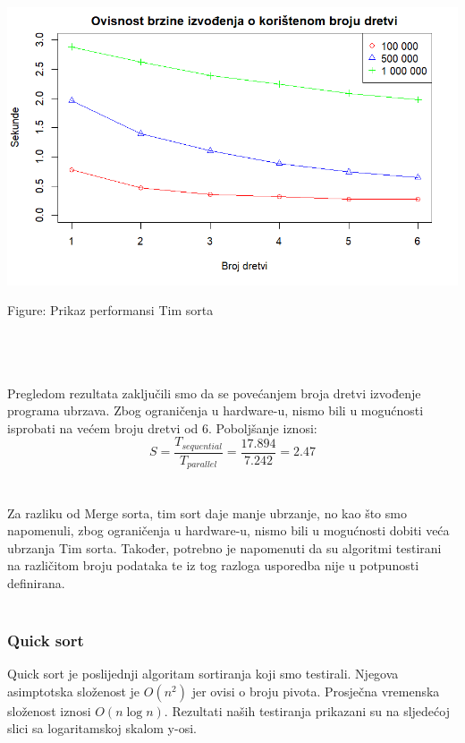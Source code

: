 \documentclass[conference]{IEEEtran}
\begin{document}
\\

\noindent
\begin{minipage}{\linewidth}
\centering
\includegraphics[width=1\linewidth]{timPerf.png}
\caption{Figure: Prikaz performansi Tim sorta}
\label{tim - performance}
\end{minipage}
\\
\\
\\

Pregledom rezultata zaključili smo da se povećanjem broja dretvi izvođenje programa ubrzava. Zbog ograničenja u hardware-u, nismo bili u mogućnosti isprobati na većem broju dretvi od 6. Poboljšanje iznosi:
\\
\begin{equation}
S = \frac{T_{sequential}}{T_{parallel}}
= \frac{17.894}{7.242} = 2.47
\label{eq:performance}
\end{equation}
\\
\\

Za razliku od Merge sorta, tim sort daje manje ubrzanje, no kao što smo napomenuli, zbog ograničenja u hardware-u, nismo bili u mogućnosti dobiti veća ubrzanja Tim sorta. Također, potrebno je napomenuti da su algoritmi testirani na različitom broju podataka te iz tog razloga usporedba nije u potpunosti definirana.
\\
\\

\subsubsection{Quick sort}
Quick sort je poslijednji algoritam sortiranja koji smo testirali. Njegova asimptotska složenost je $O(n^2)$ jer ovisi o broju pivota. Prosječna vremenska složenost iznosi $O(n \log n)$. Rezultati naših testiranja prikazani su na sljedećoj slici sa logaritamskoj skalom y-osi.
\\
\end{document}
